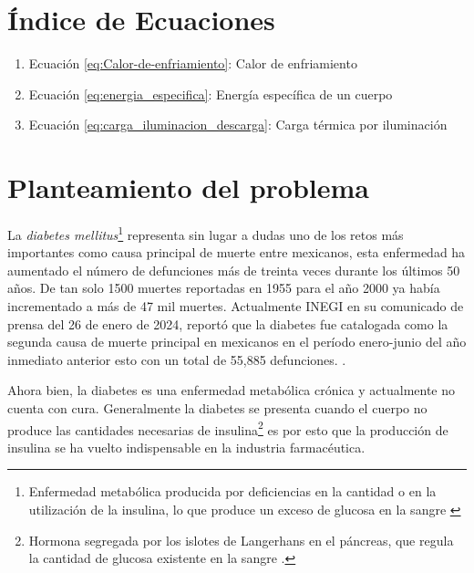 
%

	\pagenumbering{roman}

\tableofcontents
\listoftables
\listoffigures 
 
\section*{Índice de Ecuaciones}
 
 
 \begin{enumerate}
 	\item Ecuación \ref{eq:Calor-de-enfriamiento}: Calor de enfriamiento \dotfill \pageref{eq:Calor-de-enfriamiento}
 	\item Ecuación \ref{eq:energia_especifica}: Energía específica de un cuerpo \dotfill \pageref{eq:energia_especifica}
 	\item Ecuación \ref{eq:carga_iluminacion_descarga}: Carga térmica por iluminación \dotfill \pageref{eq:carga_iluminacion_descarga}
 \end{enumerate}


\newpage


\section*{Planteamiento del problema}


La \textit{diabetes mellitus}\footnote{Enfermedad metabólica producida por deficiencias en la cantidad o en la utilización de la insulina, lo que produce un exceso de glucosa en la sangre \cite{RAE01} } representa sin lugar a dudas uno de los retos más importantes como causa principal de muerte entre mexicanos, esta enfermedad ha aumentado el número de defunciones más de treinta veces durante los últimos 50 años. De tan solo 1500 muertes reportadas en 1955 para el año 2000 ya había incrementado a más de 47 mil muertes. Actualmente INEGI en su comunicado de prensa del 26 de enero de 2024, reportó que la diabetes fue catalogada como la segunda causa de muerte principal en mexicanos en el período enero-junio del año inmediato anterior esto con un total de 55,885 defunciones. \cite{hernandez2013, inegi2024}.

Ahora bien, la diabetes es una enfermedad metabólica crónica y actualmente no cuenta con cura. Generalmente la diabetes se presenta cuando el cuerpo no produce las cantidades necesarias de insulina\footnote{Hormona segregada por los islotes de Langerhans en el páncreas, que regula la cantidad de glucosa existente en la sangre \cite{RAE23}.} es por esto que la producción de insulina se ha vuelto indispensable en la industria farmacéutica.

